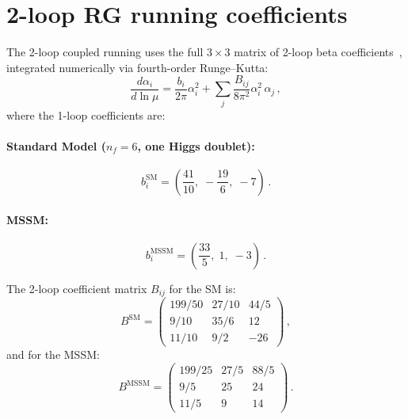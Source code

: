 \documentclass[12pt,a4paper]{article}
\newcommand{\SM}{\mathrm{SM}}
\newcommand{\MSSM}{\mathrm{MSSM}}
\begin{document}
\section{2-loop RG running coefficients}
\label{app:rg}

The 2-loop coupled running uses the full $3 \times 3$ matrix of 2-loop beta
coefficients~\cite{machacek1983,machacek1984}, integrated numerically via
fourth-order Runge--Kutta:
\begin{equation}
  \frac{d\alpha_i}{d\ln\mu} = \frac{b_i}{2\pi}\alpha_i^2
  + \sum_j \frac{B_{ij}}{8\pi^2}\alpha_i^2\,\alpha_j\,,
\end{equation}
where the 1-loop coefficients are:

\paragraph{Standard Model ($n_f = 6$, one Higgs doublet):}
\begin{equation}
  b_i^{\SM} = \left(\frac{41}{10},\; -\frac{19}{6},\; -7\right)\,.
\end{equation}

\paragraph{MSSM:}
\begin{equation}
  b_i^{\MSSM} = \left(\frac{33}{5},\; 1,\; -3\right)\,.
\end{equation}

The 2-loop coefficient matrix $B_{ij}$ for the SM is:
\begin{equation}
  B^{\SM} = \begin{pmatrix}
    199/50 & 27/10 & 44/5 \\
    9/10   & 35/6  & 12   \\
    11/10  & 9/2   & -26
  \end{pmatrix}\,,
\end{equation}
and for the MSSM:
\begin{equation}
  B^{\MSSM} = \begin{pmatrix}
    199/25 & 27/5  & 88/5 \\
    9/5    & 25    & 24   \\
    11/5   & 9     & 14
  \end{pmatrix}\,.
\end{equation}
\end{document}
